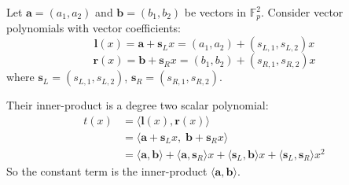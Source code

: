 \documentclass[../lecture-notes-148x210.tex]{subfiles}
\begin{document}
\begin{example}
Let $\mathbf{a} = (a_1, a_2)$ and $\mathbf{b} = (b_1, b_2)$ be vectors in $\mathbb{F}_p^2$. Consider vector polynomials with vector coefficients:
\[
\mathbf{l}(x) = \mathbf{a} + \mathbf{s}_L x = (a_1, a_2) + (s_{L,1}, s_{L,2}) x
\]
\[
\mathbf{r}(x) = \mathbf{b} + \mathbf{s}_R x = (b_1, b_2) + (s_{R,1}, s_{R,2}) x
\]
where $\mathbf{s}_L = (s_{L,1}, s_{L,2})$, $\mathbf{s}_R = (s_{R,1}, s_{R,2})$.

Their inner-product is a degree two scalar polynomial:
\begin{align*}
t(x) &= \langle \mathbf{l}(x), \mathbf{r}(x) \rangle \\
    &= \langle \mathbf{a} + \mathbf{s}_L x,\; \mathbf{b} + \mathbf{s}_R x \rangle \\
    &= \langle \mathbf{a}, \mathbf{b} \rangle + \langle \mathbf{a}, \mathbf{s}_R \rangle x + \langle \mathbf{s}_L, \mathbf{b} \rangle x + \langle \mathbf{s}_L, \mathbf{s}_R \rangle x^2
\end{align*}
So the constant term is the inner-product $\langle \mathbf{a}, \mathbf{b} \rangle$.
\end{example}
\end{document}
